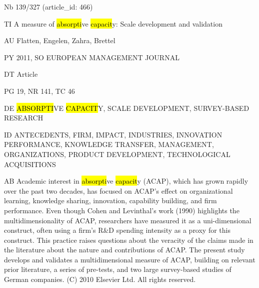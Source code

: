 \documentclass[a4paper]{article}
\begin{document}
\vspace*{-2cm}
Nb \tabto{0cm}139/327 (article\_id: 466)\par
TI \tabto{0cm}A measure of \hl{absorpti}ve \hl{capacit}y: Scale development and validation\par
AU \tabto{0cm}Flatten, Engelen, Zahra, Brettel\par
PY \tabto{0cm}2011, SO EUROPEAN MANAGEMENT JOURNAL\par
DT \tabto{0cm}Article\par
PG \tabto{0cm}19, NR 141, TC 46\par
DE \tabto{0cm}\hl{ABSORPTI}VE \hl{CAPACIT}Y, SCALE DEVELOPMENT, SURVEY-BASED RESEARCH\par
ID \tabto{0cm}ANTECEDENTS, FIRM, IMPACT, INDUSTRIES, INNOVATION PERFORMANCE, KNOWLEDGE TRANSFER, MANAGEMENT, ORGANIZATIONS, PRODUCT DEVELOPMENT, TECHNOLOGICAL ACQUISITIONS\par
AB \tabto{0cm}Academic interest in \hl{absorpti}ve \hl{capacit}y (ACAP), which has grown rapidly over the past two decades, has focused on ACAP's effect on organizational learning, knowledge sharing, innovation, capability building, and firm performance. Even though Cohen and Levinthal's work (1990) highlights the multidimensionality of ACAP, researchers have measured it as a uni-dimensional construct, often using a firm's R\&D spending intensity as a proxy for this construct. This practice raises questions about the veracity of the claims made in the literature about the nature and contributions of ACAP. The present study develops and validates a multidimensional measure of ACAP, building on relevant prior literature, a series of pre-tests, and two large survey-based studies of German companies. (C) 2010 Elsevier Ltd. All rights reserved.\par
\clearpage
\end{document}
